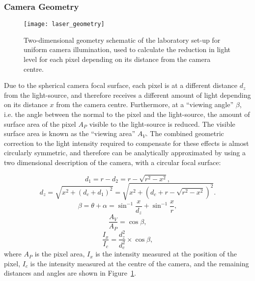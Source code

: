 \subsubsection{Camera Geometry}

\begin{figure}
	\centering
    \texttt{[image: laser\_geometry]} 
	\caption[Camera geometry correction schematic]{Two-dimensional geometry schematic of the laboratory set-up for uniform camera illumination, used to calculate the reduction in light level for each pixel depending on its distance from the camera centre.}
	\label{fig:laser_geometry}
\end{figure}



Due to the spherical camera focal surface, each pixel is at a different distance $d_z$ from the light-source, and therefore receives a different amount of light depending on its distance $x$ from the camera centre. Furthermore, at a ``viewing angle'' $\beta$, i.e. the angle between the normal to the pixel and the light-source, the amount of surface area of the pixel $A_P$ visible to the light-source is reduced. The visible surface area is known as the ``viewing area'' $A_V$. The combined geometric correction to the light intensity required to compensate for these effects is almost circularly symmetric, and therefore can be analytically approximated by using a two dimensional description of the camera, with a circular focal surface:

\begin{equation} \label{eq:geom_distance1}
d_1 = r - d_2 = r - \sqrt{r^2 - x^2},
\end{equation}
\begin{equation} \label{eq:geom_distance2}
d_z = \sqrt{x^2 + (d_c + d_1)^2} = \sqrt{x^2 + (d_c + r - \sqrt{r^2 - x^2})^2}.
\end{equation}
\begin{equation} \label{eq:viewing_area1}
\beta = \theta + \alpha = \sin^{-1}{\frac{x}{d_z}} + \sin^{-1}{\frac{x}{r}},
\end{equation}
\begin{equation} \label{eq:viewing_area2}
\frac{A_V}{A_P} = \cos{\beta},
\end{equation}
\begin{equation} \label{eq:geom_correction}
\frac{I_x}{I_c} = \frac{d_z^2}{d_c^2} \times \cos{\beta},
\end{equation}
where $A_P$ is the pixel area, $I_x$ is the intensity measured at the position of the pixel, $I_c$ is the intensity measured at the centre of the camera, and the remaining distances and angles are shown in Figure~\ref{fig:laser_geometry}.

